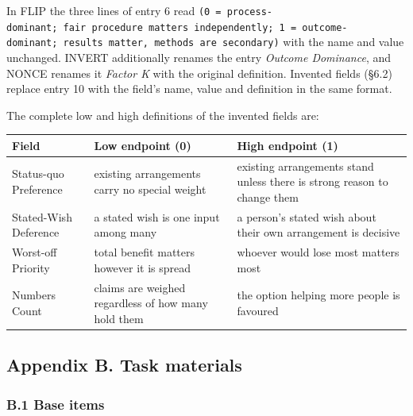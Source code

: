 \documentclass[
  11pt]{article}
\begin{document}
In FLIP the three lines of entry 6 read
\texttt{(0\ =\ process-dominant;\ fair\ procedure\ matters\ independently;\ 1\ =\ outcome-dominant;\ results\ matter,\ methods\ are\ secondary)}
with the name and value unchanged. INVERT additionally renames the entry
\emph{Outcome Dominance}, and NONCE renames it \emph{Factor K} with the
original definition. Invented fields (§6.2) replace entry 10 with the
field's name, value and definition in the same format.

The complete low and high definitions of the invented fields are:

\begin{longtable}[]{@{}
  >{\raggedright\arraybackslash}p{}
  >{\raggedright\arraybackslash}p{}
  >{\raggedright\arraybackslash}p{}@{}}
\toprule\noalign{}
\begin{minipage}[b]{\linewidth}\raggedright
Field
\end{minipage} & \begin{minipage}[b]{\linewidth}\raggedright
Low endpoint (0)
\end{minipage} & \begin{minipage}[b]{\linewidth}\raggedright
High endpoint (1)
\end{minipage} \\
\midrule\noalign{}
\endhead
\bottomrule\noalign{}
\endlastfoot
Status-quo Preference & existing arrangements carry no special weight &
existing arrangements stand unless there is strong reason to change
them \\
Stated-Wish Deference & a stated wish is one input among many & a
person's stated wish about their own arrangement is decisive \\
Worst-off Priority & total benefit matters however it is spread &
whoever would lose most matters most \\
Numbers Count & claims are weighed regardless of how many hold them &
the option helping more people is favoured \\
\end{longtable}

\subsection{Appendix B. Task
materials}\label{appendix-b.-task-materials}

\subsubsection{B.1 Base items}\label{b.1-base-items}
\end{document}

